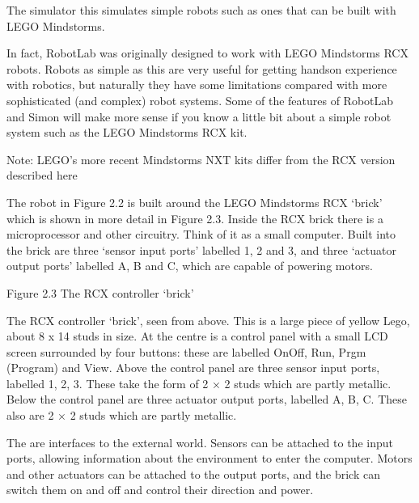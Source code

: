 \documentclass[letterpaper,10pt,english]{sphinxmanual}
\begin{document}
The  simulator this simulates simple robots such as ones that can be built with LEGO Mindstorms.


In fact, RobotLab was originally designed to work with LEGO Mindstorms RCX robots. Robots as simple as this are very useful for getting hands\sphinxhyphen{}on experience with robotics, but naturally they have some limitations compared with more sophisticated (and complex) robot systems. Some of the features of RobotLab and Simon will make more sense if you know a little bit about a simple robot system such as the LEGO Mindstorms RCX kit.





Note: LEGO’s more recent Mindstorms NXT kits differ from the RCX version described here





The robot in Figure 2.2 is built around the LEGO Mindstorms RCX ‘brick’ which is shown in more detail in Figure 2.3. Inside the RCX brick there is a microprocessor and other circuitry. Think of it as a small computer. Built into the brick are three ‘sensor input ports’ labelled 1, 2 and 3, and three ‘actuator output ports’ labelled A, B and C, which are capable of powering motors.


Figure 2.3 The RCX controller ‘brick’

The RCX controller ‘brick’, seen from above. This is a large piece of yellow Lego, about 8 x 14 studs in size. At the centre is a control panel with a small LCD screen surrounded by four buttons: these are labelled On\sphinxhyphen{}Off, Run, Prgm (Program) and View. Above the control panel are three sensor input ports, labelled 1, 2, 3. These take the form of 2 × 2 studs which are partly metallic. Below the control panel are three actuator output ports, labelled A, B, C. These also are 2 × 2 studs which are
partly metallic.

The  are interfaces to the external world. Sensors can be attached to the input ports, allowing information about the environment to enter the computer. Motors and other actuators can be attached to the output ports, and the brick can switch them on and off and control their direction and power.
\end{document}
